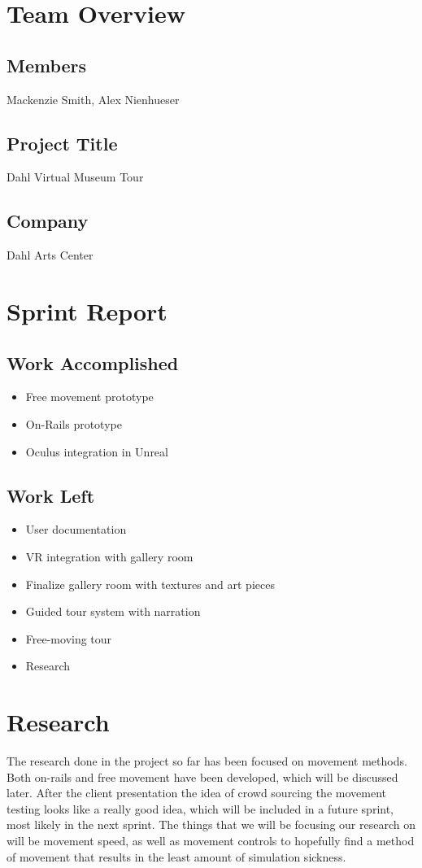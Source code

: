\documentclass[11pt]{book}
\begin{document}

\section*{Team Overview}
\hrulefill
\subsection*{Members}
Mackenzie Smith, Alex Nienhueser

\subsection*{Project Title}
Dahl Virtual Museum Tour

\subsection*{Company}
Dahl Arts Center


\section*{Sprint Report}
\hrulefill
\subsection*{Work Accomplished}
\begin{itemize}
\item Free movement prototype
\item On-Rails prototype
\item Oculus integration in Unreal

\end{itemize}
\subsection*{Work Left}
\begin{itemize}
\item User documentation
\item VR integration with gallery room
\item Finalize gallery room with textures and art pieces
\item Guided tour system with narration
\item Free-moving tour
\item Research
\end{itemize}

\section*{Research}
The research done in the project so far has been focused on movement methods.  Both on-rails and free movement have been developed, which will be discussed later.  After the client presentation the idea of crowd sourcing the movement testing looks like a really good idea, which will be included in a future sprint, most likely in the next sprint.  The things that we will be focusing our research on will be movement speed, as well as movement controls to hopefully find a method of movement that results in the least amount of simulation sickness.
\end{document}

